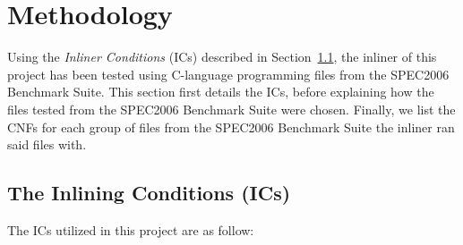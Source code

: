 
\clearpage
\section{Methodology}
\label{sec:methodology}

Using the \textit{Inliner Conditions} (ICs) described in
Section~\ref{sub:meth:inlining_conditions}, the inliner of this project has
been tested using C-language programming files from the SPEC2006 Benchmark
Suite. This section first details the ICs, before explaining how the files
tested from the SPEC2006 Benchmark Suite were chosen. Finally, we list the CNFs
for each group of files from the SPEC2006 Benchmark Suite the inliner ran said
files with.

\subsection{The Inlining Conditions (ICs)}
\label{sub:meth:inlining_conditions}

The ICs utilized in this project are as follow:

